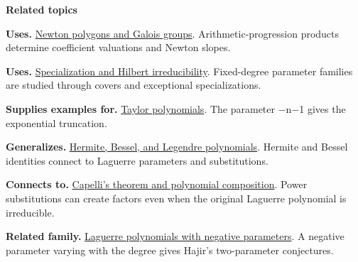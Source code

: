 \documentclass[11pt,a4paper,oneside,openany]{book}
\begin{document}
\par\medskip\begingroup\footnotesize\setlength{\parskip}{1pt}\textbf{\sffamily\color{atlasgreen}Related topics}\par
\color{black}\textbf{Uses.} \hyperlink{article:newton-polygons}{Newton polygons and Galois groups}. Arithmetic-progression products determine coefficient valuations and Newton slopes.\par
\color{black}\textbf{Uses.} \hyperlink{article:specialization}{Specialization and Hilbert irreducibility}. Fixed-degree parameter families are studied through covers and exceptional specializations.\par
\color{black}\textbf{Supplies examples for.} \hyperlink{article:taylor}{Taylor polynomials}. The parameter \ensuremath{-}n\ensuremath{-}1 gives the exponential truncation.\par
\color{black}\textbf{Generalizes.} \hyperlink{article:orthogonal-families}{Hermite, Bessel, and Legendre polynomials}. Hermite and Bessel identities connect to Laguerre parameters and substitutions.\par
\color{black}\textbf{Connects to.} \hyperlink{article:capelli-composition}{Capelli's theorem and polynomial composition}. Power substitutions can create factors even when the original Laguerre polynomial is irreducible.\par
\color{black}\textbf{Related family.} \hyperlink{article:laguerre-negative-parameters}{Laguerre polynomials with negative parameters}. A negative parameter varying with the degree gives Hajir's two-parameter conjectures.\par
\endgroup
\end{document}
